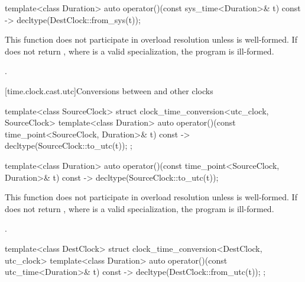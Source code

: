 %
\begin{itemdecl}
template<class Duration>
  auto operator()(const sys_time<Duration>& t) const
    -> decltype(DestClock::from_sys(t));
\end{itemdecl}

\begin{itemdescr}
\pnum
\remarks
This function does not participate in overload resolution unless
 is well-formed.
If  does not return
,
where  is a valid  specialization,
the program is ill-formed.

\pnum
\returns
{}.
\end{itemdescr}

[time.clock.cast.utc]{Conversions between  and other clocks}

\begin{codeblock}
template<class SourceClock>
struct clock_time_conversion<utc_clock, SourceClock> {
  template<class Duration>
    auto operator()(const time_point<SourceClock, Duration>& t) const
      -> decltype(SourceClock::to_utc(t));
};
\end{codeblock}

%
\begin{itemdecl}
template<class Duration>
  auto operator()(const time_point<SourceClock, Duration>& t) const
    -> decltype(SourceClock::to_utc(t));
\end{itemdecl}

\begin{itemdescr}
\pnum
\remarks
This function does not participate in overload resolution unless
 is well-formed.
If  does not return
,
where  is a valid  specialization,
the program is ill-formed.

\pnum
\returns
{}.
\end{itemdescr}

\begin{codeblock}
template<class DestClock>
struct clock_time_conversion<DestClock, utc_clock> {
  template<class Duration>
    auto operator()(const utc_time<Duration>& t) const
      -> decltype(DestClock::from_utc(t));
};
\end{codeblock}

